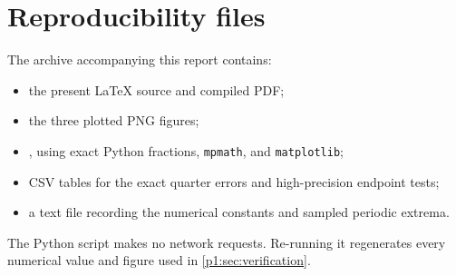 \documentclass[11pt,oneside]{article}
\numberwithin{equation}{section}
\theoremstyle{definition}
\theoremstyle{remark}
\begin{document}
\section{Reproducibility files}
\label{p1:app:reproducibility}

The archive accompanying this report contains:
\begin{itemize}
 \item the present LaTeX source and compiled PDF;
 \item the three plotted PNG figures;
 \item {}, using exact Python fractions, \texttt{mpmath}, and
 \texttt{matplotlib};
 \item CSV tables for the exact quarter errors and high-precision endpoint tests;
 \item a text file recording the numerical constants and sampled periodic extrema.
\end{itemize}
The Python script makes no network requests.  Re-running it regenerates every numerical
value and figure used in \cref{p1:sec:verification}.
\end{document}
